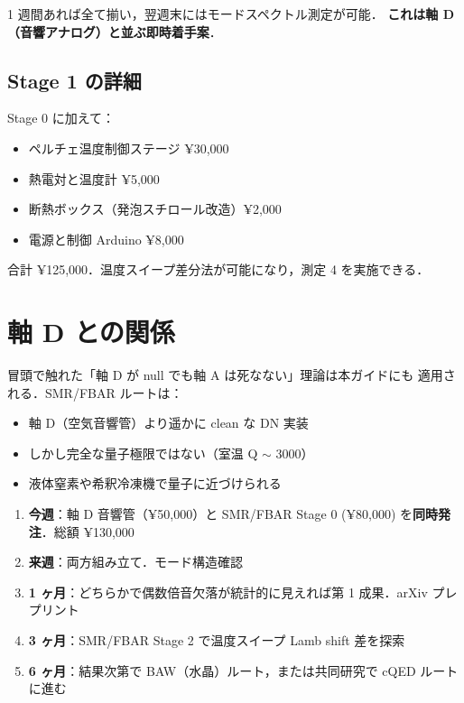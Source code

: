 \documentclass[11pt,a4paper]{article}
\begin{document}
1 週間あれば全て揃い，翌週末にはモードスペクトル測定が可能．
\textbf{これは軸 D（音響アナログ）と並ぶ即時着手案}．

\subsection{Stage 1 の詳細}

Stage 0 に加えて：
\begin{itemize}
\item ペルチェ温度制御ステージ ¥30,000
\item 熱電対と温度計 ¥5,000
\item 断熱ボックス（発泡スチロール改造）¥2,000
\item 電源と制御 Arduino ¥8,000
\end{itemize}

合計 ¥125,000．温度スイープ差分法が可能になり，測定 4 を実施できる．

\section{軸 D との関係}

冒頭で触れた「軸 D が null でも軸 A は死なない」理論は本ガイドにも
適用される．SMR/FBAR ルートは：

\begin{itemize}
\item 軸 D（空気音響管）より遥かに clean な DN 実装
\item しかし完全な量子極限ではない（室温 Q $\sim$ 3000）
\item 液体窒素や希釈冷凍機で量子に近づけられる
\end{itemize}

\begin{tcolorbox}[colback=blue!5,colframe=blue!50!black,title=推奨実行順序]
\begin{enumerate}
\item \textbf{今週}：軸 D 音響管（¥50,000）と SMR/FBAR Stage 0 (¥80,000)
を\textbf{同時発注}．総額 ¥130,000
\item \textbf{来週}：両方組み立て．モード構造確認
\item \textbf{1 ヶ月}：どちらかで偶数倍音欠落が統計的に見えれば第 1
成果．arXiv プレプリント
\item \textbf{3 ヶ月}：SMR/FBAR Stage 2 で温度スイープ Lamb shift
差を探索
\item \textbf{6 ヶ月}：結果次第で BAW（水晶）ルート，または共同研究で
cQED ルートに進む
\end{enumerate}
\end{tcolorbox}
\end{document}
